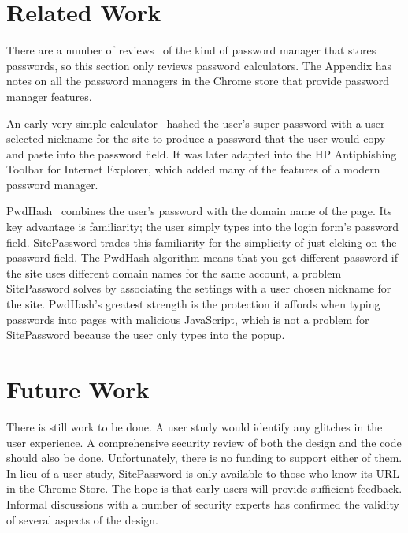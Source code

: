 \section{Related Work}\label{sec:related}

There are a number of reviews~\cite{oesch} of the kind of password manager that stores passwords, so this section only reviews password calculators.  The Appendix has notes on all the password managers in the Chrome store that provide password manager features.

An early very simple calculator~\cite{ssp} hashed the user's super password with a user selected nickname for the site to produce a password that the user would copy and paste into the password field.  It was later adapted into the HP Antiphishing Toolbar for Internet Explorer, which added many of the features of a modern password manager.

PwdHash~\cite{pwdhash} combines the user's password with the domain name of the page.  Its key advantage is familiarity; the user simply types into the login form's password field.  SitePassword trades this familiarity for the simplicity of just clcking on the password field.  The PwdHash algorithm means that you get different password if the site uses different domain names for the same account, a problem SitePassword solves by associating the settings with a user chosen nickname for the site.  PwdHash's greatest strength is the protection it affords when typing passwords into pages with malicious JavaScript, which is not a problem for SitePassword because the user only types into the popup.


\section{Future Work}\label{sec:future}

There is still work to be done.  A user study would identify any glitches in the user experience.  A comprehensive security review of both the design and the code should also be done.  Unfortunately, there is no funding to support either of them.  In lieu of a user study, SitePassword is only available to those who know its URL in the Chrome Store.  The hope is that early users will provide sufficient feedback.  Informal discussions with a number of security experts has confirmed the validity of several aspects of the design.

